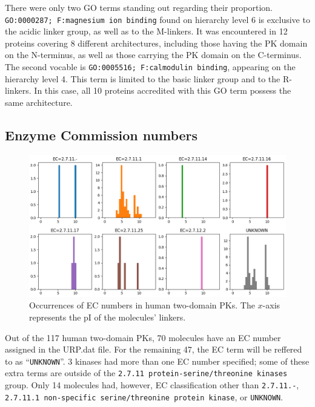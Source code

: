 		There were only two GO terms standing out regarding their proportion.
		\texttt{GO:0000287; F:magnesium ion binding} found on hierarchy level 6 is exclusive
		to the acidic linker group, as well as to the M-linkers.
		It was encountered in 12 proteins covering 8 different architectures, including those
		having the PK domain on the N-terminus, as well as those carrying the PK domain on the
		C-terminus.
		The second vocable is \texttt{GO:0005516; F:calmodulin binding}, appearing on the
		hierarchy level 4.
		This term is limited to the basic linker group and to the R-linkers.
		In this case, all 10 proteins accredited with this GO term possess the same
		architecture.

	\subsection{Enzyme Commission numbers}
	\label{res:first:ec}

		\begin{figure}
			\centering
			\includegraphics[width=\linewidth]{img/iso_density_ec.png}
			\caption{Occurrences of EC numbers in human two-domain PKs.
			The $x$-axis represents the pI of the molecules' linkers.}
			\label{fig:ec}
		\end{figure}

		Out of the 117 human two-domain PKs, 70 molecules have an EC number assigned in the
		URP.dat file.
		For the remaining 47, the EC term will be reffered to as ``\texttt{UNKNOWN}''.
		3 kinases had more than one EC number specified; some of these extra terms are
		outside of the \texttt{2.7.11 protein-serine/threonine kinases} group.
		Only 14 molecules had, however, EC classification other than \texttt{2.7.11.-},
		\texttt{2.7.11.1 non-specific serine/threonine protein kinase}, or \texttt{UNKNOWN}.

